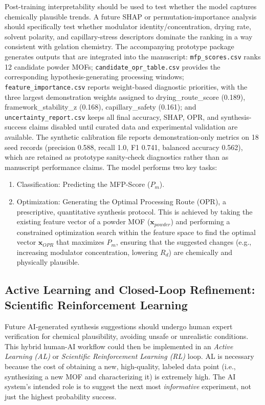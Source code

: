 \documentclass[12pt,a4paper]{article}
\begin{document}
Post-training interpretability should be used to test whether the model captures chemically plausible trends. A future SHAP or permutation-importance analysis should specifically test whether modulator identity/concentration, drying rate, solvent polarity, and capillary-stress descriptors dominate the ranking in a way consistent with gelation chemistry. The accompanying prototype package generates outputs that are integrated into the manuscript: \texttt{mfp\_scores.csv} ranks 12 candidate powder MOFs; \texttt{candidate\_opr\_table.csv} provides the corresponding hypothesis-generating processing windows; \texttt{feature\_importance.csv} reports weight-based diagnostic priorities, with the three largest demonstration weights assigned to drying\_route\_score (0.189), framework\_stability\_z (0.168), capillary\_safety (0.161); and \texttt{uncertainty\_report.csv} keeps all final accuracy, SHAP, OPR, and synthesis-success claims disabled until curated data and experimental validation are available. The synthetic calibration file reports demonstration-only metrics on 18 seed records (precision 0.588, recall 1.0, F1 0.741, balanced accuracy 0.562), which are retained as prototype sanity-check diagnostics rather than as manuscript performance claims.
The model performs two key tasks:
\begin{enumerate}
    \item Classification: Predicting the MFP-Score ($P_m$).
    \item Optimization: Generating the Optimal Processing Route (OPR), a prescriptive, quantitative synthesis protocol. This is achieved by taking the existing feature vector of a powder MOF ($\mathbf{x}_{powder}$) and performing a constrained optimization search within the feature space to find the optimal vector $\mathbf{x}_{OPR}$ that maximizes $P_m$, ensuring that the suggested changes (e.g., increasing modulator concentration, lowering $R_d$) are chemically and physically plausible.
\end{enumerate}

\subsection{Active Learning and Closed-Loop Refinement: Scientific Reinforcement Learning}

Future AI-generated synthesis suggestions should undergo human expert verification for chemical plausibility, avoiding unsafe or unrealistic conditions. This hybrid human-AI workflow could then be implemented in an \textit{Active Learning (AL)} or \textit{Scientific Reinforcement Learning (RL)} loop. AL is necessary because the cost of obtaining a new, high-quality, labeled data point (i.e., synthesizing a new MOF and characterizing it) is extremely high. The AI system's intended role is to suggest the next most \textit{informative} experiment, not just the highest probability success.\cite{ref18}
\end{document}
